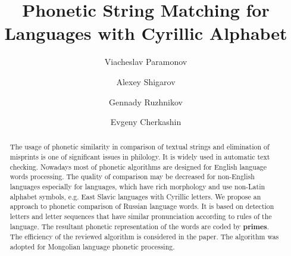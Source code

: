 \documentclass{svproc}
\begin{document}
\mainmatter              %
%
\title{Phonetic String Matching for Languages with Cyrillic Alphabet }
%
%
\author{Viacheslav Paramonov   \and Alexey Shigarov 
\and Gennady Ruzhnikov \and Evgeny Cherkashin  }
%
%
%

\maketitle              %

\begin{abstract}

The usage of phonetic similarity in comparison of textual strings and elimination of misprints is one of significant issues in philology. It is widely used in automatic text checking. Nowadays most of phonetic algorithms are designed for English language words processing. The quality of comparison may be decreased for non-English languages especially for languages, which have rich morphology and use non-Latin alphabet symbols, e.g. East Slavic languages with Cyrillic letters. We propose an approach to phonetic comparison of Russian language words. It is based on detection letters and letter sequences that have similar pronunciation according to rules of the language. The resultant phonetic representation of the words are coded by \textbf{primes}. The efficiency of the reviewed algorithm is considered in the paper. The algorithm was adopted for Mongolian language phonetic processing.
\end{abstract}
\end{document}
